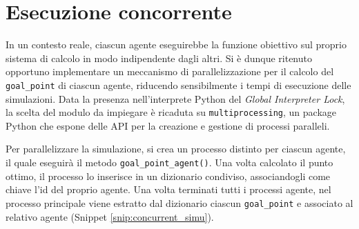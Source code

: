 \section{Esecuzione concorrente} \label{subsec:concur_agents}

In un contesto reale, ciascun agente eseguirebbe la funzione obiettivo sul proprio sistema di calcolo in modo indipendente dagli altri.
Si è dunque ritenuto opportuno implementare un meccanismo di parallelizzazione per il calcolo del \texttt{goal\_point} di ciascun agente, riducendo sensibilmente i tempi di esecuzione delle simulazioni.
Data la presenza nell'interprete Python del \textit{Global Interpreter Lock}, la scelta del modulo da impiegare è ricaduta su \texttt{multiprocessing}, un package Python che espone delle API per la creazione e gestione di processi paralleli.

 Per parallelizzare la simulazione, si crea un processo distinto per ciascun agente, il quale eseguirà il metodo \texttt{goal\_point\_agent()}.
 Una volta calcolato il punto ottimo, il processo lo inserisce in un dizionario condiviso, associandogli come chiave l'id del proprio agente.
Una volta terminati tutti i processi agente, nel processo principale viene estratto dal dizionario ciascun \texttt{goal\_point} e associato al relativo agente (Snippet \ref{snip:concurrent_simu}).
